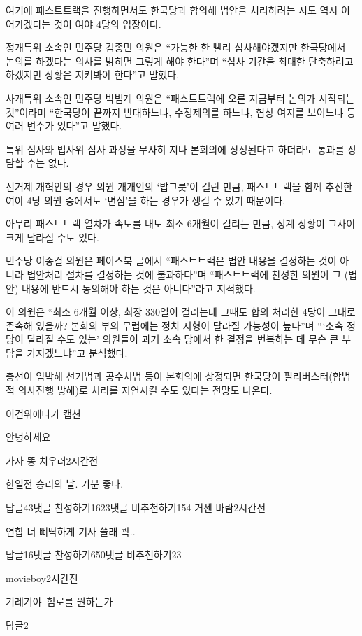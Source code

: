 \documentclass[final,doctor,korean,pdfdoc]{konkukthesis}
\begin{document}
여기에 패스트트랙을 진행하면서도 한국당과 합의해 법안을 처리하려는 시도 역시 이어가겠다는 것이 여야 4당의 입장이다.

정개특위 소속인 민주당 김종민 의원은 ``가능한 한 빨리 심사해야겠지만 한국당에서 논의를 하겠다는 의사를 밝히면 그렇게 해야 한다''며 ``심사 기간을 최대한 단축하려고 하겠지만 상황은 지켜봐야 한다''고 말했다.

사개특위 소속인 민주당 박범계 의원은 ``패스트트랙에 오른 지금부터 논의가 시작되는 것''이라며 ``한국당이 끝까지 반대하느냐, 수정제의를 하느냐, 협상 여지를 보이느냐 등 여러 변수가 있다''고 말했다.

특위 심사와 법사위 심사 과정을 무사히 지나 본회의에 상정된다고 하더라도 통과를 장담할 수는 없다.

선거제 개혁안의 경우 의원 개개인의 `밥그릇'이 걸린 만큼, 패스트트랙을 함께 추진한 여야 4당 의원 중에서도 `변심'을 하는 경우가 생길 수 있기 때문이다.

아무리 패스트트랙 열차가 속도를 내도 최소 6개월이 걸리는 만큼, 정계 상황이 그사이 크게 달라질 수도 있다.

민주당 이종걸 의원은 페이스북 글에서 ``패스트트랙은 법안 내용을 결정하는 것이 아니라 법안처리 절차를 결정하는 것에 불과하다''며 ``패스트트랙에 찬성한 의원이 그 (법안) 내용에 반드시 동의해야 하는 것은 아니다''라고 지적했다.

이 의원은 ``최소 6개월 이상, 최장 330일이 걸리는데 그때도 합의 처리한 4당이 그대로 존속해 있을까? 본회의 부의 무렵에는 정치 지형이 달라질 가능성이 높다''며 ```소속 정당이 달라질 수도 있는' 의원들이 과거 소속 당에서 한 결정을 번복하는 데 무슨 큰 부담을 가지겠느냐''고 분석했다.

총선이 임박해 선거법과 공수처법 등이 본회의에 상정되면 한국당이 필리버스터(합법적 의사진행 방해)로 처리를 지연시킬 수도 있다는 전망도 나온다.
\begin{table}
 \caption{이건위에다가 캡션}
 안녕하세요 
\end{table}

\clearpage

\begin{abstractKor}
가자 똥 치우러2시간전 \par
한일전 승리의 날. 기분 좋다. \par
답글43댓글 찬성하기1623댓글 비추천하기154 
\textbf{}
거센-바람2시간전 \par
연합 너 삐딱하게 기사 쓸래 콱.. \par
답글16댓글 찬성하기650댓글 비추천하기23 

movieboy2시간전 \par 
기레기야\, 험로를 원하는가 \par 
답글2
\end{abstractKor}
\end{document}
